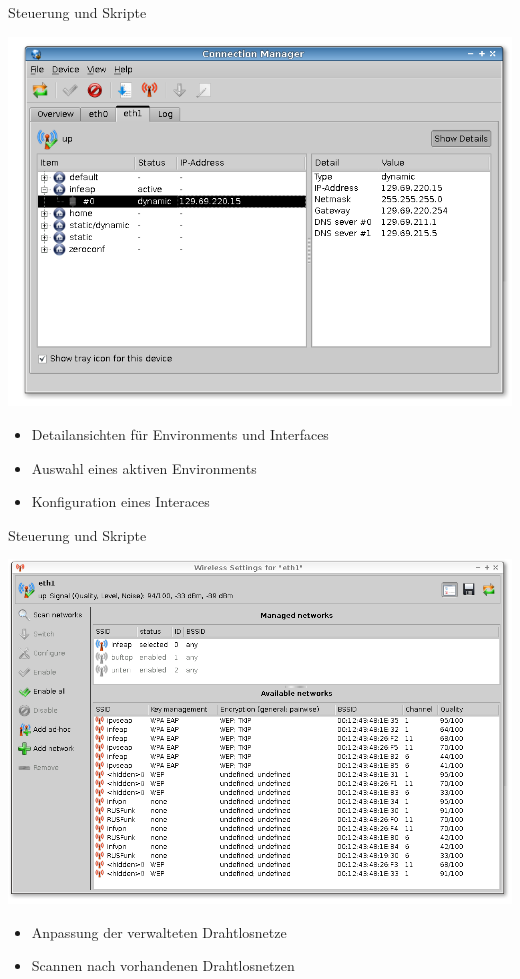 \begin{frame}[<+-| alert@+>]{Steuerung und Skripte}

		\includegraphics[scale=0.25]{qnut_detailed.png}

	\begin{itemize}
		\item Detailansichten für Environments und Interfaces
		\item Auswahl eines aktiven Environments
		\item Konfiguration eines Interaces
	\end{itemize}
\end{frame}

\begin{frame}[<+-| alert@+>]{Steuerung und Skripte}

		\includegraphics[scale=0.25]{qnut_scan.png}

	\begin{itemize}
		\item Anpassung der verwalteten Drahtlosnetze
		\item Scannen nach vorhandenen Drahtlosnetzen
	\end{itemize}
\end{frame}

